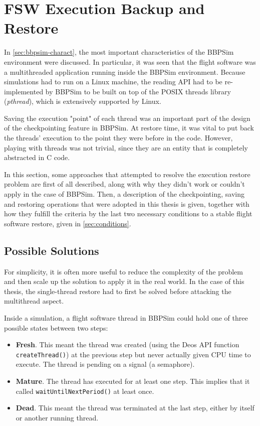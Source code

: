 \section{FSW Execution Backup and Restore}\label{sec:das-exec-restore}
In \autoref{sec:bbpsim-charact}, the most important characteristics of the BBPSim environment were discussed. In particular, it was seen that the flight software was a multithreaded application running inside the \gls{BBPSim} environment. Because simulations had to run on a Linux machine, the reading API had to be re-implemented by BBPSim to be built on top of the POSIX threads library (\textit{pthread}), which is extensively supported by Linux. 

Saving the execution "point" of each thread was an important part of the design of the checkpointing feature in BBPSim. At restore time, it was vital to put back the threads' execution to the point they were before in the code. However, playing with threads was not trivial, since they are an entity that is completely abstracted in C code.

In this section, some approaches that attempted to resolve the execution restore problem are first of all described, along with why they didn't work or couldn't apply in the case of BBPSim. Then, a description of the checkpointing, saving and restoring operations that were adopted in this thesis is given, together with how they fulfill the criteria by the last two necessary conditions to a stable flight software restore, given in \autoref{sec:conditions}. 

\subsection*{Possible Solutions}
For simplicity, it is often more useful to reduce the complexity of the problem and then scale up the solution to apply it in the real world. In the case of this thesis, the single-thread restore had to first be solved before attacking the multithread aspect. 

Inside a simulation, a flight software thread in BBPSim could hold one of three possible states between two steps:
\begin{itemize}
	\item \textbf{Fresh}. This meant the thread was created (using the Deos API function \texttt{createThread()}) at the previous step but never actually given CPU time to execute. The thread is pending on a signal (a semaphore).
	\item \textbf{Mature}. The thread has executed for at least one step. This implies that it called \texttt{waitUntilNextPeriod()} at least once.
	\item \textbf{Dead}. This meant the thread was terminated at the last step, either by itself or another running thread.
\end{itemize}

